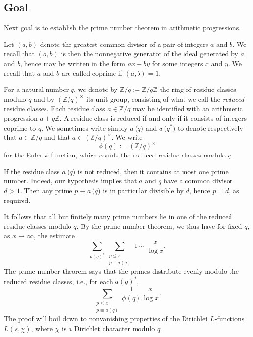 \documentclass[reqno]{amsart}  \numberwithin{theorem}{section} \numberwithin{equation}{section}
\begin{document}
\subsection{Goal}\label{sec:cj578xc1wz}
Next goal is to establish the prime number theorem in arithmetic progressions.

Let $(a,b)$ denote the greatest common divisor of a pair of integers $a$ and $b$.  We recall that $(a,b)$ is then the nonnegative generator of the ideal generated by $a$ and $b$, hence may be written in the form $a x + b y$ for some integers $x$ and $y$.  We recall that $a$ and $b$ are called coprime if $(a,b) = 1$.

For a natural number $q$, we denote by $\mathbb{Z} / q := \mathbb{Z} / q \mathbb{Z}$ the ring of residue classes modulo $q$ and by $(\mathbb{Z} / q)^\times$ its unit group, consisting of what we call the \emph{reduced} residue classes.  Each residue class $a \in \mathbb{Z} / q$ may be identified with an arithmetic progression $a + q \mathbb{Z}$.  A residue class is reduced if and only if it consists of integers coprime to $q$.  We sometimes write simply $a \pod{q}$ and $a \pod{q}^*$ to denote respectively that $a \in \mathbb{Z} / q$ and that $a \in (\mathbb{Z} / q)^\times$.  We write
\begin{equation*}
  \phi(q) := (\mathbb{Z} / q) ^\times
\end{equation*}
for the Euler $\phi$ function, which counts the reduced residue classes modulo $q$.

If the residue class $a \pod{q}$ is not reduced, then it contains at most one prime number.  Indeed, our hypothesis implies that $a$ and $q$ have a common divisor $d > 1$.  Then any prime $p \equiv a \pod{q}$ is in particular divisible by $d$, hence $p = d$, as required.

It follows that all but finitely many prime numbers lie in one of the reduced residue classes modulo $q$.  By the prime number theorem, we thus have for fixed $q$, as $x \rightarrow \infty$, the estimate
\begin{equation*}
  \sum_{a (q)^*} \sum_{
    \substack{
      p \leq x  \\
      p \equiv  a(q)
    }
  }
  1
  \sim \frac{x}{ \log x}.
\end{equation*}
The prime number theorem says that the primes distribute evenly modulo the reduced residue classes, i.e., for each $a(q)^*$,
\begin{equation*}
  \sum_{
    \substack{
      p \leq x  \\
      p \equiv a (q)
    }
  }
  \frac{1}{\phi(q)}
  \frac{x}{\log x}.
\end{equation*}
The proof will boil down to nonvanishing properties of the Dirichlet $L$-functions $L(s,\chi)$, where $\chi$ is a Dirichlet character modulo $q$.
\end{document}
